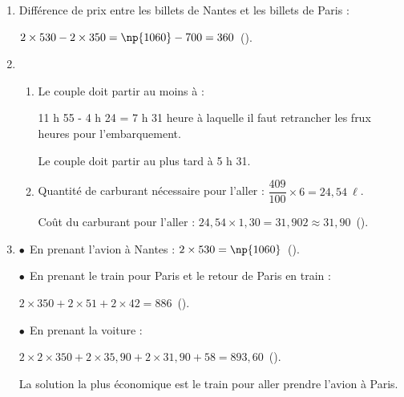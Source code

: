 \documentclass[10pt]{article}
\newcommand{\euro}{\eurologo{}}
\begin{document}
\begin{enumerate}
\item %
Différence de prix entre les billets de Nantes et les billets de Paris :

$2\times 530 - 2\times 350 = \np{1060} - 700 = 360$~(\euro). 
\item %
	\begin{enumerate}
		\item %
Le couple doit partir au moins à :

11 h 55 - 4 h 24 = 7 h 31 heure à laquelle il faut retrancher les frux heures pour l'embarquement.

Le couple doit partir au plus tard à 5 h 31. 
		\item %
Quantité de carburant nécessaire pour l'aller : $\dfrac{409}{100}\times 6 = 24,54~\ell$.

Coût du carburant pour l'aller : $24,54 \times 1,30 = 31,902 \approx 31,90$~(\euro).
	\end{enumerate} 
\item %
$\bullet~~$En prenant l'avion à Nantes : $2 \times 530 = \np{1060}$~(\euro).

$\bullet~~$En prenant le train pour Paris et le retour de Paris en train : 

$2 \times 350 + 2 \times 51 + 2 \times 42 = 886$~(\euro).

$\bullet~~$En prenant la voiture :

$2 \times 2 \times 350 + 2 \times 35,90 +  2 \times 31,90 + 58 = 893,60$~(\euro).

La solution la plus économique est le train pour aller prendre l'avion à Paris.  
\end{enumerate}
\end{document}
